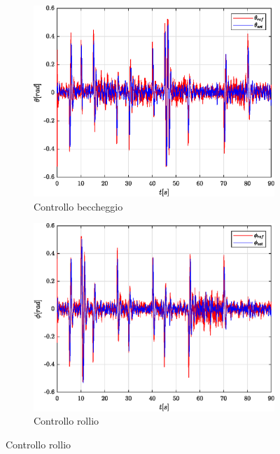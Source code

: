 \begin{figure}
	\centering
	\begin{subfigure}{0.45\textwidth}
		\centering
		\includegraphics[width=1\textwidth]{Simulazioni/Figure/SMC/SNAKE_MIL/AttitudeControlPitch}
		\caption{Controllo beccheggio}
		\label{fig:SNAKEbecSMC_MIL}
	\end{subfigure}
	\hfill
	\begin{subfigure}{0.45\textwidth}
		\centering
		\includegraphics[width=1\textwidth]{Simulazioni/Figure/SMC/SNAKE_MIL/AttitudeControlRoll}
		\caption{Controllo rollio}
		\label{fig:SNAKErolSMC_MIL}
	\end{subfigure}

\end{figure}
